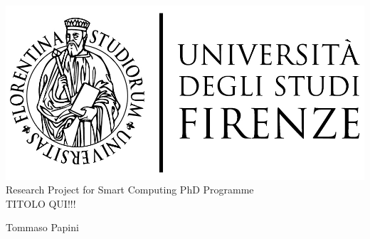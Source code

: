 \documentclass{article}
\begin{document}
    
    \begin{center}
        \includegraphics[scale=0.2]{logo_unifi.jpg}\\[2cm]
        Research Project for Smart Computing PhD Programme\\[0.3cm]
        {\huge TITOLO QUI!!!}
    \end{center}
    
    \vfill
    
    Tommaso Papini
    
    \clearpage
\end{document}
